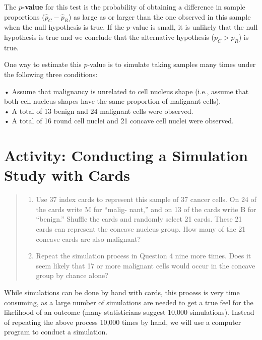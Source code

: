 \documentclass[
]{report}
\providecommand{\tightlist}{%
  \setlength{\itemsep}{0pt}\setlength{\parskip}{0pt}}
\begin{document}
The \textbf{\(p\)-value} for this test is the probability of obtaining a difference in sample proportions (\(\hat p_C - \hat p_R\)) as large as or larger than the one observed in this sample when the null hypothesis is true. If the \(p\)-value is small, it is unlikely that the null hypothesis is true and we conclude that the alternative hypothesis (\(p_C > p_R\)) is true.

One way to estimate this \(p\)-value is to simulate taking samples many times under the following three conditions:

• Assume that malignancy is unrelated to cell nucleus shape (i.e., assume that both cell nucleus shapes have the same proportion of malignant cells).\\
• A total of 13 benign and 24 malignant cells were observed.\\
• A total of 16 round cell nuclei and 21 concave cell nuclei were observed.

\section*{Activity: Conducting a Simulation Study with Cards}\label{activity-conducting-a-simulation-study-with-cards}

\begin{quote}
\begin{enumerate}
\def\labelenumi{\arabic{enumi}.}
\setcounter{enumi}{3}
\tightlist
\item
  Use 37 index cards to represent this sample of 37 cancer cells. On 24 of the cards write M for ``malig-
  nant,'' and on 13 of the cards write B for ``benign.'' Shuffle the cards and randomly select 21 cards. These
  21 cards can represent the concave nucleus group. How many of the 21 concave cards are also malignant?
\item
  Repeat the simulation process in Question 4 nine more times. Does it seem likely that 17 or more
  malignant cells would occur in the concave group by chance alone?
\end{enumerate}
\end{quote}

While simulations can be done by hand with cards, this process is very time consuming, as a large number
of simulations are needed to get a true feel for the likelihood of an outcome (many statisticians suggest
10,000 simulations). Instead of repeating the above process 10,000 times by hand, we will use a computer
program to conduct a simulation.
\end{document}

